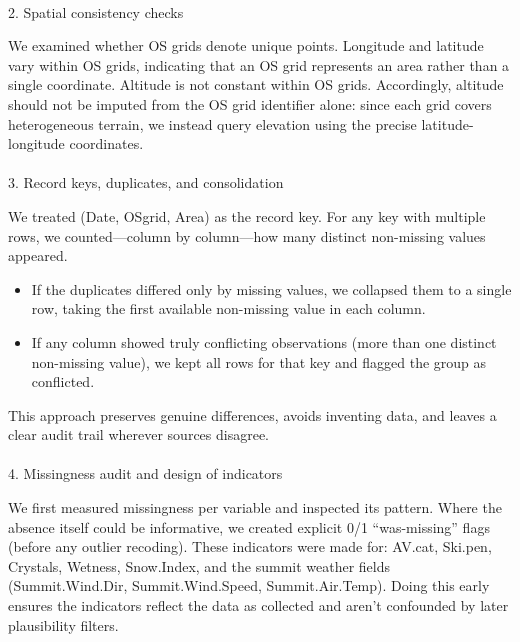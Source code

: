 \documentclass[
  letterpaper,
  DIV=11,
  numbers=noendperiod]{scrartcl}
\makeatletter
\let\oldparagraph\paragraph
\renewcommand{\paragraph}{
    \@ifstar
      \xxxParagraphStar
      \xxxParagraphNoStar
  }
\newcommand{\xxxParagraphStar}[1]{\oldparagraph*{#1}\mbox{}}
\newcommand{\xxxParagraphNoStar}[1]{\oldparagraph{#1}\mbox{}}
\providecommand{\tightlist}{%
  \setlength{\itemsep}{0pt}\setlength{\parskip}{0pt}}\usepackage{longtable,booktabs,array}
\makeatother
\begin{document}
\paragraph{2. Spatial consistency
checks}\label{spatial-consistency-checks}

We examined whether OS grids denote unique points. Longitude and
latitude vary within OS grids, indicating that an OS grid represents an
area rather than a single coordinate. Altitude is not constant within OS
grids. Accordingly, altitude should not be imputed from the OS grid
identifier alone: since each grid covers heterogeneous terrain, we
instead query elevation using the precise latitude-longitude
coordinates.

\paragraph{3. Record keys, duplicates, and
consolidation}\label{record-keys-duplicates-and-consolidation}

We treated (Date, OSgrid, Area) as the record key. For any key with
multiple rows, we counted---column by column---how many distinct
non-missing values appeared.

\begin{itemize}
\tightlist
\item
  If the duplicates differed only by missing values, we collapsed them
  to a single row, taking the first available non-missing value in each
  column.\\
\item
  If any column showed truly conflicting observations (more than one
  distinct non-missing value), we kept all rows for that key and flagged
  the group as conflicted.
\end{itemize}

This approach preserves genuine differences, avoids inventing data, and
leaves a clear audit trail wherever sources disagree.

\paragraph{4. Missingness audit and design of
indicators}\label{missingness-audit-and-design-of-indicators}

We first measured missingness per variable and inspected its pattern.
Where the absence itself could be informative, we created explicit 0/1
``was-missing'' flags (before any outlier recoding). These indicators
were made for: AV.cat, Ski.pen, Crystals, Wetness, Snow.Index, and the
summit weather fields (Summit.Wind.Dir, Summit.Wind.Speed,
Summit.Air.Temp). Doing this early ensures the indicators reflect the
data as collected and aren't confounded by later plausibility filters.
\end{document}
